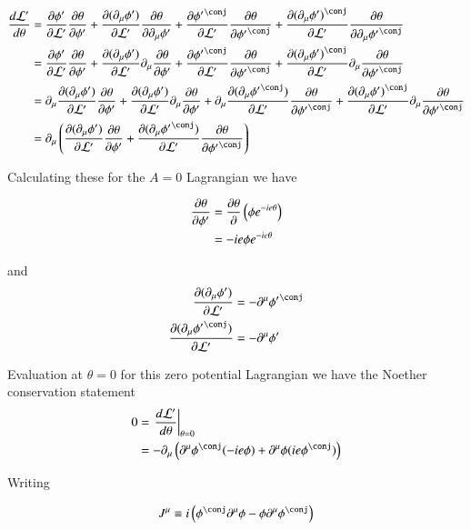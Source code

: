 \documentclass{article}
\begin{document}
\begin{align*}
\frac{d\LL'}{d\theta} 
&=
\PD{\phi'}{\LL'} \PD{\theta}{\phi'} 
+\PD{(\partial_\mu \phi')}{\LL'} \PD{\theta}{\partial_\mu \phi'}
+\PD{{\phi'}^\conj}{\LL'} \PD{\theta}{{\phi'}^\conj}
+\PD{(\partial_\mu {\phi')}^\conj}{\LL'} \PD{\theta}{\partial_\mu {\phi'}^\conj} \\
&=
\PD{\phi'}{\LL'} \PD{\theta}{\phi'} 
+\PD{(\partial_\mu \phi')}{\LL'} \partial_\mu \PD{\theta}{\phi'}
+\PD{{\phi'}^\conj}{\LL'} \PD{\theta}{{\phi'}^\conj}
+\PD{(\partial_\mu {\phi')}^\conj}{\LL'} \partial_\mu \PD{\theta}{{\phi'}^\conj} \\
&=
\partial_\mu \PD{(\partial_\mu \phi')}{\LL'} 
\PD{\theta}{\phi'} 
+\PD{(\partial_\mu \phi')}{\LL'} \partial_\mu \PD{\theta}{\phi'}
+
\partial_\mu \PD{(\partial_\mu {\phi'}^\conj)}{\LL'} 
\PD{\theta}{{\phi'}^\conj}
+\PD{(\partial_\mu {\phi')}^\conj}{\LL'} \partial_\mu \PD{\theta}{{\phi'}^\conj} \\
&=
\partial_\mu \left( 
\PD{(\partial_\mu \phi')}{\LL'} \PD{\theta}{\phi'} 
+
\PD{(\partial_\mu {\phi'}^\conj)}{\LL'} \PD{\theta}{{\phi'}^\conj}
\right)
\end{align*}

Calculating these for the $A=0$ Lagrangian we have

\begin{align*}
\frac{\partial{\theta}}{\partial {\phi'}} 
&= \frac{\partial{\theta}}{\partial {}} \left( \phi e^{-i e \theta} \right) \\
&= -i e \phi e^{-i e \theta} \\
\end{align*}

and
\begin{align*}
\PD{(\partial_\mu \phi')}{\LL'} &= - \partial^\mu {\phi'}^\conj \\
\PD{(\partial_\mu {\phi'}^\conj)}{\LL'} &= - \partial^\mu \phi' \\
\end{align*}

Evaluation at $\theta=0$ for this zero potential Lagrangian we have the Noether conservation statement
\begin{align*}
0 
&=
\left. \frac{d\LL'}{d\theta} \right\vert_{\theta=0} \\
&=
-\partial_\mu \left( \partial^\mu \phi^\conj (-i e \phi ) + \partial^\mu \phi (i e \phi^\conj ) \right)
\end{align*}

Writing

\begin{align}
J^\mu \equiv i \left( \phi^\conj \partial^\mu \phi - \phi \partial^\mu \phi^\conj \right)
\end{align}
\end{document}
